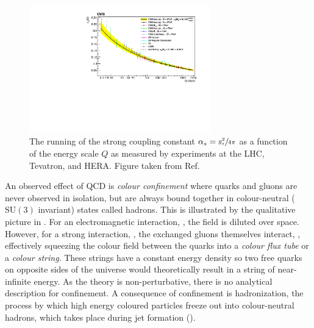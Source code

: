 \begin{figure}[h]
    \centering
    \includegraphics[width=0.7\textwidth]{Figures/standard_model/running}
    \caption{The running of the strong coupling constant $\alpha_s = \sfrac{g_s^2}{4\pi}$ as a function of the energy scale $Q$ as measured by experiments at the LHC, Tevatron, and HERA. Figure taken from Ref.~\cite{CMSRunning}}
    \label{fig:asymptotic_freedom}
\end{figure}

An observed effect of QCD is \textit{colour confinement} where quarks and gluons are never observed in isolation, but are always bound together in colour-neutral ($\text{SU}(3)$ invariant) states called hadrons.
This is illustrated by the qualitative picture in .
For an electromagnetic interaction, , the field is diluted over space.
However, for a strong interaction, , the exchanged gluons themselves interact, , effectively squeezing the colour field between the quarks into a \textit{colour flux tube} or a \textit{colour string}.
These strings have a constant energy density so two free quarks on opposite sides of the universe would theoretically result in a string of near-infinite energy.
As the theory is non-perturbative, there is no analytical description for confinement.
A consequence of confinement is hadronization, the process by which high energy coloured particles freeze out into colour-neutral hadrons, which takes place during jet formation ().

